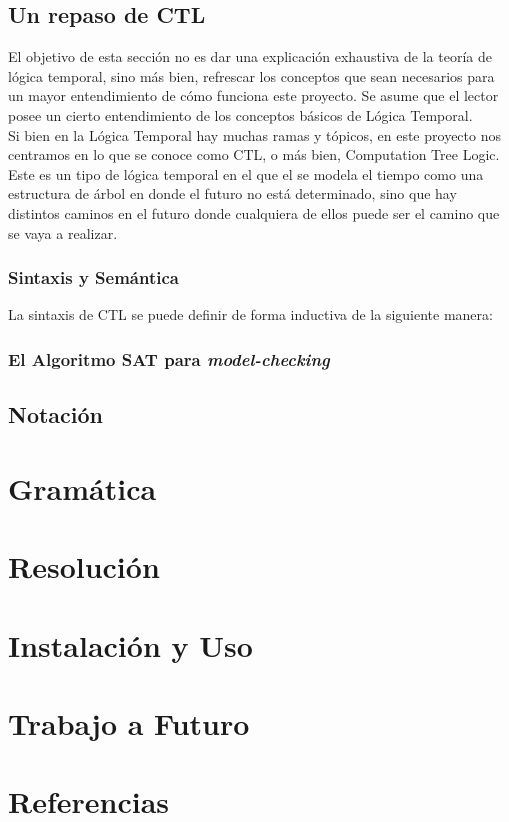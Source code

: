 \documentclass[11pt]{article}
\begin{document}
\subsection{Un repaso de CTL}
El objetivo de esta sección no es dar una explicación exhaustiva de la teoría de 
lógica temporal, sino más bien, refrescar los conceptos que sean necesarios 
para un mayor entendimiento de cómo funciona este proyecto. Se asume que el lector
posee un cierto entendimiento de los conceptos básicos de Lógica Temporal. \\

Si bien en la Lógica Temporal hay muchas ramas y tópicos, en este proyecto nos 
centramos en lo que se conoce como CTL, o más bien, Computation Tree Logic. Este
es un tipo de lógica temporal en el que el se modela el tiempo como una estructura
de árbol en donde el futuro no está determinado, sino que hay distintos caminos 
en el futuro donde cualquiera de ellos puede ser el camino que se vaya a realizar.

\subsubsection{Sintaxis y Semántica}

La sintaxis de CTL se puede definir de forma inductiva de la siguiente manera:

\subsubsection{El Algoritmo SAT para \emph{model-checking}}
\subsection{Notación}

\section{Gramática}

\section{Resolución}

\section{Instalación y Uso}

\section{Trabajo a Futuro}

\section{Referencias}
\end{document}
